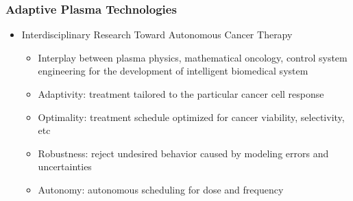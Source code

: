 \documentclass[hyperref={pdftex,pdfpagemode=none,pdfstartview=Fit}]{beamer}
\begin{document}
\begin{frame}
    \frametitle{Adaptive Plasma Technologies} 
    
    \begin{itemize}
        \item Interdisciplinary Research Toward Autonomous Cancer Therapy
            \begin{itemize}
                \item Interplay between plasma physics, mathematical oncology, control system engineering for the development of intelligent biomedical system
                \item Adaptivity: treatment tailored to the particular cancer cell response
                \item Optimality: treatment schedule optimized for cancer viability, selectivity, etc
                \item Robustness: reject undesired behavior caused by modeling errors and uncertainties
                \item Autonomy: autonomous scheduling for dose and frequency
            \end{itemize}
    \end{itemize}
\end{frame}
\end{document}
